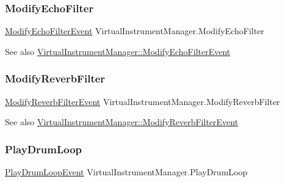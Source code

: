 \subsubsection{\texorpdfstring{Modify\+Echo\+Filter}{ModifyEchoFilter}}
{\footnotesize\ttfamily \hyperlink{class_virtual_instrument_manager_1_1_modify_echo_filter_event}{Modify\+Echo\+Filter\+Event} Virtual\+Instrument\+Manager.\+Modify\+Echo\+Filter}

\begin{DoxySeeAlso}{See also}
\hyperlink{class_virtual_instrument_manager_1_1_modify_echo_filter_event}{Virtual\+Instrument\+Manager\+::\+Modify\+Echo\+Filter\+Event} 
\end{DoxySeeAlso}
\mbox{\label{group___virtual_instrument_manager_event_types_gaadd137e073cb3849f610a46e0d032858}} 
\subsubsection{\texorpdfstring{Modify\+Reverb\+Filter}{ModifyReverbFilter}}
{\footnotesize\ttfamily \hyperlink{class_virtual_instrument_manager_1_1_modify_reverb_filter_event}{Modify\+Reverb\+Filter\+Event} Virtual\+Instrument\+Manager.\+Modify\+Reverb\+Filter}

\begin{DoxySeeAlso}{See also}
\hyperlink{class_virtual_instrument_manager_1_1_modify_reverb_filter_event}{Virtual\+Instrument\+Manager\+::\+Modify\+Reverb\+Filter\+Event} 
\end{DoxySeeAlso}
\mbox{\label{group___virtual_instrument_manager_event_types_ga5657ff4bcc7de6d240d7092ffd22a6fe}} 
\subsubsection{\texorpdfstring{Play\+Drum\+Loop}{PlayDrumLoop}}
{\footnotesize\ttfamily \hyperlink{class_virtual_instrument_manager_1_1_play_drum_loop_event}{Play\+Drum\+Loop\+Event} Virtual\+Instrument\+Manager.\+Play\+Drum\+Loop}

